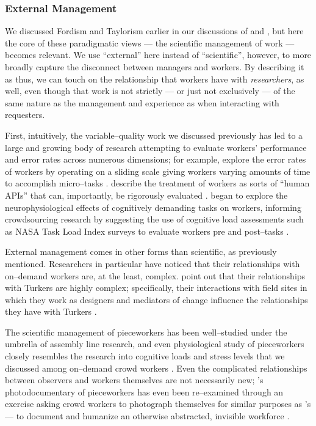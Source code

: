 \documentclass[trackingWork]{subfiles}
\begin{document}
{\subsubsection{External Management}
We discussed Fordism and Taylorism earlier in our discussions of
 and ,
but here the core of these paradigmatic views
--- the scientific management of work ---
becomes relevant.
We use ``external'' here instead of ``scientific'', however,
to more broadly capture the disconnect between managers and workers.
By describing it as thus,
we can touch on the relationship that workers have with \textit{researchers}, as well,
even though that work is not strictly
--- or just not exclusively ---
of the same nature as the management and experience as when interacting with requesters.

First, intuitively, the variable--quality work we discussed previously has led to
a large and growing body of research attempting to evaluate workers' performance and error rates
across numerous dimensions;
for example, \citeauthor{measuringCrowdsourcingCheng} explore the error rates of workers by
operating on a sliding scale giving workers varying amounts of time to accomplish micro--tasks
\cite{measuringCrowdsourcingCheng}.
\citeauthor{storiesIraniSilberman} describe the treatment of workers
as sorts of ``human APIs'' that can, importantly, be rigorously evaluated
\cite{storiesIraniSilberman}.
\citeauthor{gevins2003neurophysiological} began to explore the neurophysiological effects of
cognitively demanding tasks on workers,
informing crowdsourcing research by suggesting the use of cognitive load assessments such as
NASA Task Load Index surveys to evaluate workers pre and post--tasks
\cite{embracingErrorKrishna,measuringCrowdsourcingCheng}.


External management comes in other forms than scientific, as previously mentioned.
Researchers in particular have noticed that their relationships with on--demand workers are,
at the least, complex.
\citeauthor{storiesIraniSilberman} point out that their relationships with Turkers are highly complex;
specifically, their interactions with field sites in which they work
as designers and mediators of change influence the relationships they have with Turkers
\cite{storiesIraniSilberman}.

The scientific management of pieceworkers has been well--studied under the umbrella of assembly line research,
and even physiological study of pieceworkers closely resembles the
research into cognitive loads and stress levels that we discussed among on--demand crowd workers
\cite{hu1961parallel,pieceworkBiologicalHarm}.
Even the complicated relationships between observers and workers themselves are not necessarily new;
\citeauthor{riisOtherSideLives}'s photodocumentary of pieceworkers has even been re--examined through an exercise asking crowd workers
to photograph themselves for similar purposes as \citeauthor{riisOtherSideLives}'s --- to document and humanize an otherwise abstracted, invisible workforce
\cite{facesOfMechanicalTurk,turkopticon,riisOtherSideLives}.

}
\end{document}
